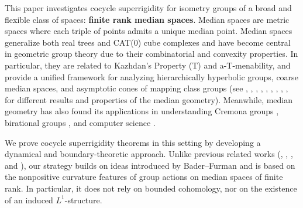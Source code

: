 \documentclass{amsart}
\numberwithin{equation}{section}
\theoremstyle{definition}
\begin{document}
This paper investigates cocycle superrigidity for isometry groups of a broad and flexible class of spaces: \textbf{finite rank median spaces}. Median spaces are metric spaces where each triple of points admits a unique median point. Median spaces generalize both real trees and CAT(0) cube complexes and have become central in geometric group theory due to their combinatorial and convexity properties. In particular, they are related to Kazhdan's Property (T) and a-T-menability, and provide a unified framework for analyzing hierarchically hyperbolic groups, coarse median spaces, and asymptotic cones of mapping class groups (see \cite{ChaDH_median}, \cite{ChaD_hyperbolic}, \cite{Fior_tits}, \cite{Fior_median_property}, \cite{Fior_superrigidity}, \cite{Fior_auto}, \cite{Bowd_conv}, \cite{Bowd_median-algebras}, \cite{Genevois}, \cite{Messaci} for different results and properties of the median geometry). Meanwhile, median geometry has also found its applications in understanding Cremona groups \cite{LonjouUrech}, birational groups \cite{CdC}, and computer science \cite{BandeltChepoi}. \par

We prove cocycle superrigidity theorems in this setting by developing a dynamical and boundary-theoretic approach. Unlike previous related works (\cite{Shalom-superrigidity}, \cite{Monod}, \cite{Monod-Shalom}, \cite{Gelander-Karlsson-Margulis} and \cite{Fior_superrigidity}), our strategy builds on ideas introduced by Bader--Furman \cite{BaderFurman} and is based on the nonpositive curvature features of group actions on median spaces of finite rank. In particular, it does not rely on bounded cohomology, nor on the existence of an induced $L^1$-structure.
\end{document}

